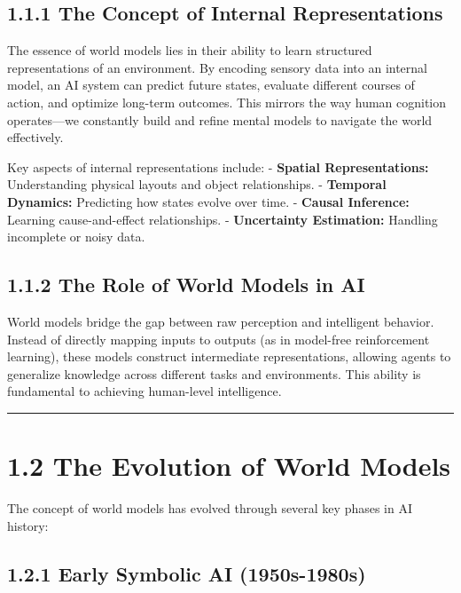 \documentclass[
]{book}
\begin{document}
\subsection{1.1.1 The Concept of Internal Representations}\label{the-concept-of-internal-representations}

The essence of world models lies in their ability to learn structured representations of an environment. By encoding sensory data into an internal model, an AI system can predict future states, evaluate different courses of action, and optimize long-term outcomes. This mirrors the way human cognition operates---we constantly build and refine mental models to navigate the world effectively.

Key aspects of internal representations include:
- \textbf{Spatial Representations:} Understanding physical layouts and object relationships.
- \textbf{Temporal Dynamics:} Predicting how states evolve over time.
- \textbf{Causal Inference:} Learning cause-and-effect relationships.
- \textbf{Uncertainty Estimation:} Handling incomplete or noisy data.

\subsection{1.1.2 The Role of World Models in AI}\label{the-role-of-world-models-in-ai}

World models bridge the gap between raw perception and intelligent behavior. Instead of directly mapping inputs to outputs (as in model-free reinforcement learning), these models construct intermediate representations, allowing agents to generalize knowledge across different tasks and environments. This ability is fundamental to achieving human-level intelligence.

\begin{center}\rule{0.5\linewidth}{0.5pt}\end{center}

\section{1.2 The Evolution of World Models}\label{the-evolution-of-world-models}

The concept of world models has evolved through several key phases in AI history:

\subsection{1.2.1 Early Symbolic AI (1950s-1980s)}\label{early-symbolic-ai-1950s-1980s}
\end{document}
